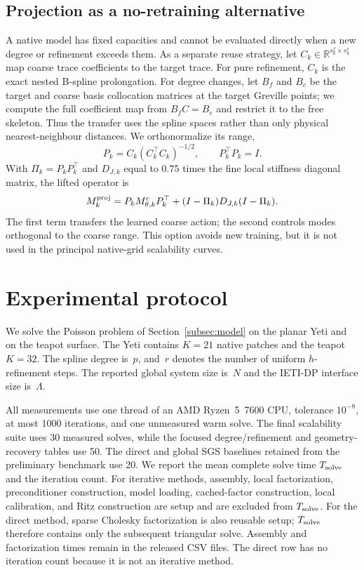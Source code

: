 \documentclass{article}
\newcommand{\R}{\mathbb{R}}
\theoremstyle{plain}
\numberwithin{equation}{section}
\begin{document}
\subsection{Projection as a no-retraining alternative}
\label{subsec:projection}

A native model has fixed capacities and cannot be evaluated directly when a
new degree or refinement exceeds them.  As a separate reuse strategy, let
$C_k\in\R^{s_k^f\times s_k^c}$ map coarse trace coefficients to the target
trace.  For pure refinement, $C_k$ is the exact nested B-spline
prolongation.  For degree changes, let $B_f$ and $B_c$ be the target and
coarse basis collocation matrices at the target Greville points; we compute
the full coefficient map from $B_f C=B_c$ and restrict it to the free
skeleton.  Thus the transfer uses the spline spaces rather than only physical
nearest-neighbour distances.  We orthonormalize its range,
\[
    P_k=C_k(C_k^\top C_k)^{-1/2},\qquad P_k^\top P_k=I .
\]
With
$\Pi_k=P_kP_k^\top$ and $D_{J,k}$ equal to $0.75$ times the fine local
stiffness diagonal matrix, the lifted operator is
\begin{equation}
    M_{k}^{\rm proj}=P_kM_{\theta,k}^cP_k^\top
    +(I-\Pi_k)D_{J,k}(I-\Pi_k).
    \label{eq:journal-projection}
\end{equation}
The first term transfers the learned coarse action; the second controls modes
orthogonal to the coarse range.  This option avoids new training, but it is
not used in the principal native-grid scalability curves.

\section{Experimental protocol}
\label{sec:protocol}

We solve the Poisson problem of Section~\ref{subsec:model} on the planar Yeti
and on the teapot surface.  The Yeti contains $K=21$ native patches and the
teapot $K=32$.  The spline degree is~$p$, and~$r$ denotes the number of uniform
$h$-refinement steps.  The reported global system size is~$N$ and the
IETI-DP interface size is~$\Lambda$.

All measurements use one thread of an AMD Ryzen~5~7600 CPU, tolerance
$10^{-8}$, at most 1000 iterations, and one unmeasured warm solve.  The final
scalability suite uses 30 measured solves, while the focused
degree/refinement and geometry-recovery tables use 50.  The direct and global
SGS baselines retained from the preliminary benchmark use 20.
We report the mean complete solve time
$T_{\rm solve}$ and the iteration count.  For iterative methods, assembly,
local factorization, preconditioner construction, model loading, cached-factor
construction, local calibration, and Ritz construction are setup and are excluded from
$T_{\rm solve}$.  For the direct method, sparse Cholesky factorization is also
reusable setup; $T_{\rm solve}$ therefore contains only the subsequent
triangular solve.  Assembly and factorization times remain in the released CSV
files.  The direct row has no iteration count because it is not an iterative
method.
\end{document}
